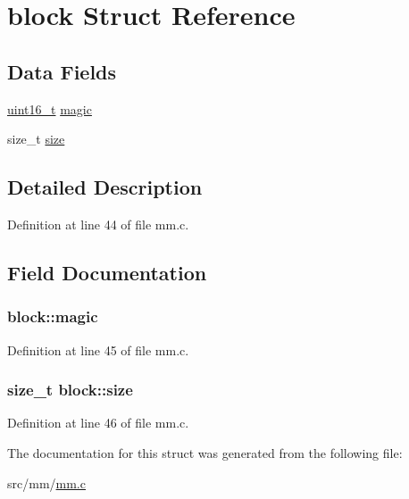 \hypertarget{structblock}{\section{block Struct Reference}
\label{structblock}
}
\subsection*{Data Fields}
\begin{DoxyCompactItemize}
\item 
\hyperlink{aplus_8h_a5a8b2dc9e45a9ee81a94ef304fb62505}{uint16\+\_\+t} \hyperlink{structblock_a0dc8afecb033f59b42e0d8502a7f8ff0}{magic}
\item 
size\+\_\+t \hyperlink{structblock_a40c8e08013eb90aa6db19e1cbc7f3186}{size}
\end{DoxyCompactItemize}


\subsection{Detailed Description}


Definition at line 44 of file mm.\+c.



\subsection{Field Documentation}
\hypertarget{structblock_a0dc8afecb033f59b42e0d8502a7f8ff0}{
\subsubsection[{magic}]{ block\+::magic}}\label{structblock_a0dc8afecb033f59b42e0d8502a7f8ff0}


Definition at line 45 of file mm.\+c.

\hypertarget{structblock_a40c8e08013eb90aa6db19e1cbc7f3186}{
\subsubsection[{size}]{\setlength{\rightskip}{0pt plus 5cm}size\+\_\+t block\+::size}}\label{structblock_a40c8e08013eb90aa6db19e1cbc7f3186}


Definition at line 46 of file mm.\+c.



The documentation for this struct was generated from the following file\+:\begin{DoxyCompactItemize}
\item 
src/mm/\hyperlink{mm_8c}{mm.\+c}\end{DoxyCompactItemize}
